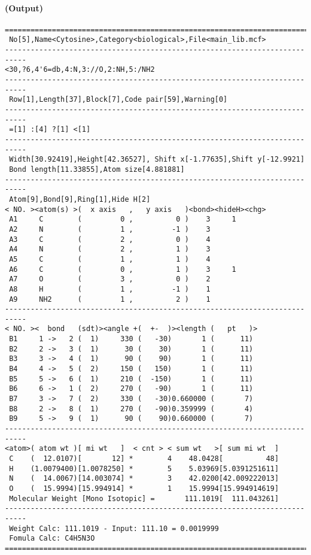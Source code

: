 \documentclass[a4paper]{article}
\begin{document}
\paragraph{(Output)}
\begin{verbatim}
===========================================================================
 No[5],Name<Cytosine>,Category<biological>,File<main_lib.mcf>
---------------------------------------------------------------------------
<30,?6,4'6=db,4:N,3://O,2:NH,5:/NH2
---------------------------------------------------------------------------
 Row[1],Length[37],Block[7],Code pair[59],Warning[0]
---------------------------------------------------------------------------
 =[1] :[4] ?[1] <[1]
---------------------------------------------------------------------------
 Width[30.92419],Height[42.36527], Shift x[-1.77635],Shift y[-12.9921]
 Bond length[11.33855],Atom size[4.881881]
---------------------------------------------------------------------------
 Atom[9],Bond[9],Ring[1],Hide H[2]
< NO. ><atom(s) >(  x axis   ,   y axis   )<bond><hideH><chg>
 A1     C        (         0 ,          0 )    3     1
 A2     N        (         1 ,         -1 )    3        
 A3     C        (         2 ,          0 )    4        
 A4     N        (         2 ,          1 )    3        
 A5     C        (         1 ,          1 )    4        
 A6     C        (         0 ,          1 )    3     1
 A7     O        (         3 ,          0 )    2        
 A8     H        (         1 ,         -1 )    1        
 A9     NH2      (         1 ,          2 )    1        
---------------------------------------------------------------------------
< NO. ><  bond   (sdt)><angle +(  +-  )><length (   pt   )>
 B1     1 ->   2 (  1)     330 (   -30)       1 (      11)
 B2     2 ->   3 (  1)      30 (    30)       1 (      11)
 B3     3 ->   4 (  1)      90 (    90)       1 (      11)
 B4     4 ->   5 (  2)     150 (   150)       1 (      11)
 B5     5 ->   6 (  1)     210 (  -150)       1 (      11)
 B6     6 ->   1 (  2)     270 (   -90)       1 (      11)
 B7     3 ->   7 (  2)     330 (   -30)0.660000 (       7)
 B8     2 ->   8 (  1)     270 (   -90)0.359999 (       4)
 B9     5 ->   9 (  1)      90 (    90)0.660000 (       7)
---------------------------------------------------------------------------
<atom>( atom wt )[ mi wt   ]  < cnt > < sum wt   >[ sum mi wt  ]
 C    (  12.0107)[       12] *        4    48.0428[          48]
 H    (1.0079400)[1.0078250] *        5    5.03969[5.0391251611]
 N    (  14.0067)[14.003074] *        3    42.0200[42.009222013]
 O    (  15.9994)[15.994914] *        1    15.9994[15.994914619]
 Molecular Weight [Mono Isotopic] =       111.1019[  111.043261]
---------------------------------------------------------------------------
 Weight Calc: 111.1019 - Input: 111.10 = 0.0019999
 Fomula Calc: C4H5N3O
===========================================================================
\end{verbatim}
\newpage
\noindent%
\end{document}
